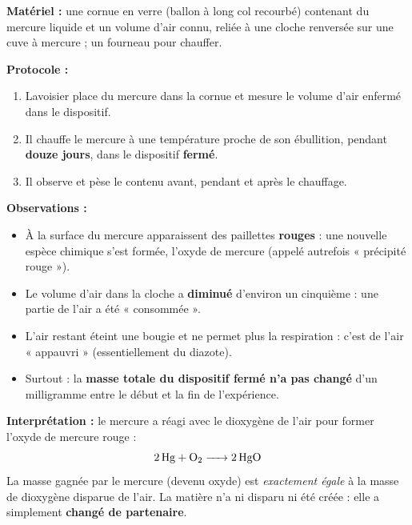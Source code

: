 \documentclass[11pt]{article}
\newcommand{\cle}[1]{{\popxbold\color{popdark}#1}}
\begin{document}
\begin{experience}
\textbf{Matériel :} une cornue en verre (ballon à long col recourbé) contenant du \cle{mercure} liquide et un volume d'air connu, reliée à une cloche renversée sur une cuve à mercure ; un fourneau pour chauffer.

\textbf{Protocole :}
\begin{enumerate}
\item Lavoisier place du mercure dans la cornue et mesure le volume d'air enfermé dans le dispositif.
\item Il chauffe le mercure à une température proche de son ébullition, pendant \textbf{douze jours}, dans le dispositif \textbf{fermé}.
\item Il observe et pèse le contenu avant, pendant et après le chauffage.
\end{enumerate}

\textbf{Observations :}
\begin{itemize}
\item À la surface du mercure apparaissent des paillettes \textbf{rouges} : une nouvelle espèce chimique s'est formée, l'\cle{oxyde de mercure} (appelé autrefois « précipité rouge »).
\item Le volume d'air dans la cloche a \textbf{diminué} d'environ un cinquième : une partie de l'air a été « consommée ».
\item L'air restant éteint une bougie et ne permet plus la respiration : c'est de l'air « appauvri » (essentiellement du diazote).
\item Surtout : la \textbf{masse totale du dispositif fermé n'a pas changé} d'un milligramme entre le début et la fin de l'expérience.
\end{itemize}

\textbf{Interprétation :} le mercure a réagi avec le dioxygène de l'air pour former l'oxyde de mercure rouge :
\[ \ce{2Hg + O2 -> 2HgO} \]
La masse gagnée par le mercure (devenu oxyde) est \emph{exactement égale} à la masse de dioxygène disparue de l'air. La matière n'a ni disparu ni été créée : elle a simplement \textbf{changé de partenaire}.
\end{experience}
\end{document}
